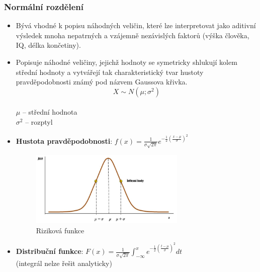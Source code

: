 \subsubsection{Normální rozdělení}
\begin{itemize}
	\item Bývá vhodné k popisu náhodných veličin, které lze interpretovat jako aditivní výsledek mnoha nepatrných a vzájemně nezávislých faktorů (výška člověka, IQ, délka končetiny).
	\item Popisuje náhodné veličiny, jejichž hodnoty se symetricky shlukují kolem střední hodnoty a vytvářejí tak charakteristický tvar hustoty pravděpodobnosti známý pod názvem Gaussova křivka. $$X \sim N (\mu;\sigma^2)$$  \\$\mu$ -- střední hodnota \\ $\sigma^2$ -- rozptyl
	\item \textbf{Hustota pravděpodobnosti}: $f(x) = \frac{1}{\sigma \sqrt{2\pi}} e^{-\frac{1}{2}({\frac{x - \mu}{\sigma}})^2}$
	\begin{figure}[H]
	\centering
	\includegraphics[width=0.7\textwidth]{assets/12_norm_roz}
	\caption{Riziková funkce}
	\end{figure}
	\item \textbf{Distribuční funkce}: $F(x) = \frac{1}{\sigma \sqrt{2\pi}} \int_{-\infty}^{x} e^{-\frac{1}{2}(\frac{t - \mu}{\sigma})^2} dt$\\ (integrál nelze řešit analyticky)
\end{itemize}

